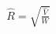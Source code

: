 \documentclass[preview]{standalone}
\begin{document}
\begin{align*}
\hat{R} = \sqrt{\frac{\hat{V}}{W}}
\end{align*}
\end{document}
